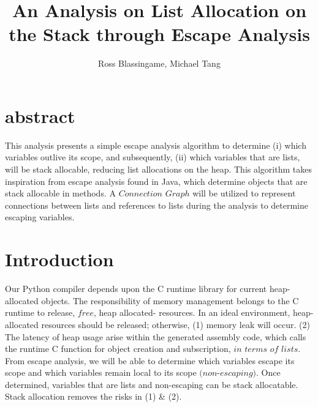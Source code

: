 \documentclass[11pt,article]{amsart}
\author{Ross Blassingame, Michael Tang}
\title{An Analysis on List Allocation on the Stack through Escape Analysis}
\theoremstyle{definition}
\numberwithin{equation}{subsection}
\begin{document}
\maketitle
\begin{multicols}{2}
\section{abstract}
This analysis presents a simple escape analysis algorithm to determine (i) which variables outlive its scope, and subsequently, (ii) which variables that are lists, will be stack allocable, reducing list allocations on the heap. This algorithm takes inspiration from escape analysis found in Java, which determine objects that are stack allocable in methods. A $Connection$ $Graph$ will be utilized to represent connections between lists and references to lists during the analysis to determine escaping variables. 
\section{Introduction}
Our Python compiler depends upon the C runtime library for current heap-allocated objects. The responsibility of memory management belongs to the C runtime to release, $free$, heap allocated- resources. In an ideal environment, heap-allocated resources should be released; otherwise, (1) memory leak will occur. (2) The latency of heap usage arise within the generated assembly code, which calls the runtime C function for object creation and subscription, $in$ $terms$ $of$ $lists$. From escape analysis, we will be able to determine which variables escape its scope and which variables remain local to its scope $(non$-$escaping)$. Once determined, variables that are lists and non-escaping can be stack allocatable. Stack allocation removes the risks in (1) \& (2). 


\end{multicols}
\end{document}
